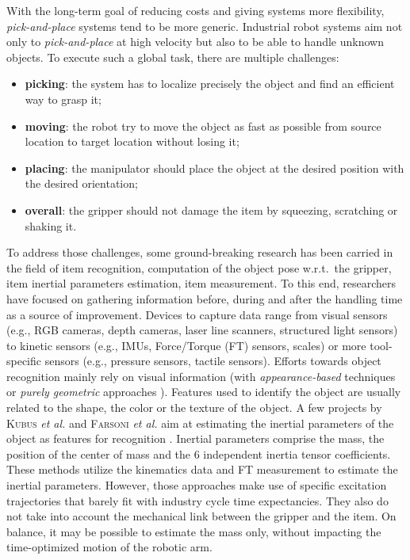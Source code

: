 \documentclass[/home/francois/latex/report/main.tex]{subfiles}
\begin{document}
With the long-term goal of reducing costs and giving systems more flexibility, \textit{pick-and-place} systems tend to be more generic. Industrial robot systems aim not only to \textit{pick-and-place} at high velocity but also to be able to handle unknown objects. To execute such a global task, there are multiple challenges:
\begin{itemize}
    \item \textbf{picking}: the system has to localize precisely the object and find an efficient way to grasp it;
    \item \textbf{moving}: the robot try to move the object as fast as possible from source location to target location without losing it;
    \item \textbf{placing}: the manipulator should place the object at the desired position with the desired orientation;
    \item \textbf{overall}: the gripper should not damage the item by squeezing, scratching or shaking it.
\end{itemize}

To address those challenges, some ground-breaking research has been carried in the field of item recognition, computation of the object pose w.r.t.\ the gripper, item inertial parameters estimation, item measurement. To this end, researchers have focused on gathering information before, during and after the handling time as a source of improvement. Devices to capture data range from visual sensors (e.g., RGB cameras, depth cameras, laser line scanners, structured light sensors) to kinetic sensors (e.g., \ac{IMUs}, Force/Torque (FT) sensors, scales) or more tool-specific sensors (e.g., pressure sensors, tactile sensors). Efforts towards object recognition mainly rely on visual information (with \textit{appearance-based} techniques \cite{Carmichael2002, Schmid1997, Viola2001, Murase1993} or \textit{purely geometric} approaches \cite{Hut1987, Sethi2001}). Features used to identify the object are usually related to the shape, the color or the texture of the object. A few projects by \textsc{Kubus} \textit{et al.} and \textsc{Farsoni} \textit{et al.} aim at estimating the inertial parameters of the object as features for recognition \cite{Kubus2008, Kubus2007, Kubus2014, Farsoni2018}. Inertial parameters comprise the mass, the position of the center of mass and the 6 independent inertia tensor coefficients. These methods utilize the kinematics data and \ac{FT} measurement to estimate the inertial parameters. However, those approaches make use of specific excitation trajectories that barely fit with industry cycle time expectancies. They also do not take into account the mechanical link between the gripper and the item. On balance, it may be possible to estimate the mass only, without impacting the time-optimized motion of the robotic arm.
\end{document}
